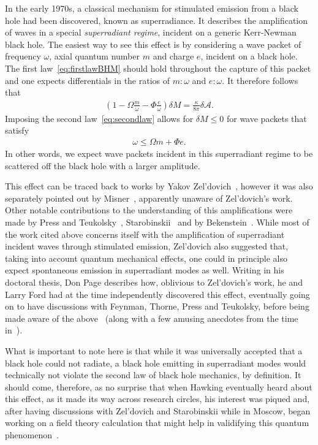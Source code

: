 \documentclass[
twoside,
openright,
frontopenright,
]{dmathesis}
\begin{document}
In the early 1970s, a classical mechanism for stimulated emission from a black
hole had been discovered, known as superradiance. It describes the amplification
of waves in a special \emph{superradiant regime}, incident on a generic
Kerr-Newman black hole. The easiest way to see this effect is by considering a
wave packet of frequency $\omega$, axial quantum number $m$ and charge $e$,
incident on a black hole. The first law~\eqref{eq:firstlawBHM} should hold
throughout the capture of this packet and one expects differentials in the
ratios of $m:\omega$ and $e:\omega$. It therefore follows that
\begin{align}
  \left(1-\Omega \frac{m}{\omega}-\Phi\frac{e}{\omega}\right) \delta M = \frac{\kappa}{8\pi}\delta\mathcal{A}.
\end{align}
Imposing the second law~\eqref{eq:secondlaw} allows for $\delta M \leqslant 0$
for wave packets that satisfy
\begin{align}
  \label{eq:superradiant}
  \omega \leqslant \Omega m + \Phi e.
\end{align}
In other words, we expect wave packets incident in this superradiant regime to be
scattered off the black hole with a larger amplitude.

This effect can be traced back to works by Yakov
Zel'dovich~\cite{Zeldovich:1970aa,Zeldovich:1972aa}, however it was also
separately pointed out by Misner~\cite{Misner:1972kx}, apparently unaware of
Zel'dovich's work. Other notable contributions to the understanding of this
amplifications were made by Press and Teukolsky~\cite{Press:1972zz},
Starobinskii~\cite{Starobinskii:1973aa} and by
Bekenstein~\cite{Bekenstein:1973mi}. While most of the work cited above concerns
itself with the amplification of superradiant incident waves through stimulated
emission, Zel'dovich also suggested that, taking into account quantum mechanical
effects, one could in principle also expect spontaneous emission in superradiant
modes as well. Writing in his doctoral thesis, Don Page describes how, oblivious
to Zel'dovich's work, he and Larry Ford had at the time independently discovered
this effect, eventually going on to have discussions with Feynman, Thorne, Press
and Teukolsky, before being made aware of the above~\cite{Page:1976zz} (along
with a few amusing anecdotes from the time in~\cite{Page:2006my}).

What is important to note here is that while it was universally accepted that a
black hole could not radiate, a black hole emitting in superradiant modes would
technically not violate the second law of black hole mechanics, by
definition. It should come, therefore, as no surprise that when Hawking
eventually heard about this effect, as it made its way across research circles,
his interest was piqued and, after having discussions with Zel'dovich and
Starobinskii while in Moscow, began working on a field theory calculation that
might help in validifying this quantum phenomenon~\cite{Page:2006my}.
\end{document}
